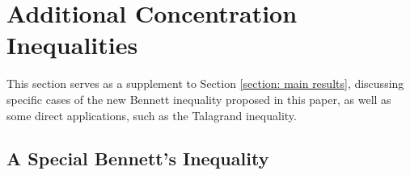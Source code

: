 \documentclass{article}
\begin{document}
\section{Additional Concentration Inequalities
}

\label{section: G}

This section serves as a supplement to Section \ref{section: main results}, discussing specific cases of the new Bennett inequality proposed in this paper, as well as some direct applications, such as the Talagrand inequality.
\subsection{A Special Bennett's Inequality}
\label{sec-app:a_special_bennett_inequality}
\end{document}
